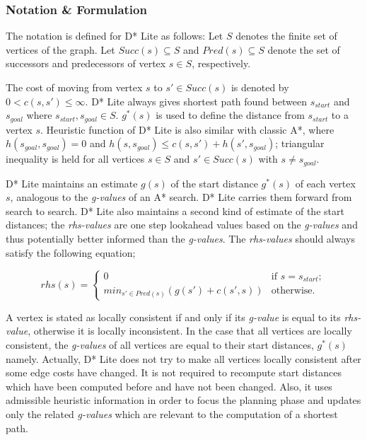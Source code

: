 \documentclass[10pt,journal]{IEEEtran}
\begin{document}
\subsubsection{Notation \& Formulation}
The notation is defined for D* Lite as follows: Let $S$ denotes the finite set of vertices of the graph. Let $Succ(s) \subseteq S$ and $Pred(s) \subseteq S$ denote the set of successors and predecessors of vertex $s \in S$, respectively. 

The cost of moving from vertex $s$ to $s' \in Succ(s)$ is denoted by $0 < c(s, s') \leq \infty$. D* Lite always gives shortest path found between $s_{start}$ and $s_{goal}$ where $s_{start}, s_{goal} \in S$. $g^*(s)$ is used to define the distance from $s_{start}$ to a vertex $s$. Heuristic function of D* Lite is also similar with classic A*, where $h(s_{goal}, s_{goal}) = 0$ and $h(s, s_{goal}) \leq c(s, s') + h(s', s_{goal})$; triangular inequality is held for all vertices $s \in S$ and $s' \in Succ(s)$ with $s \neq s_{goal}$.

D* Lite maintains an estimate $g(s)$ of the start distance $g^*(s)$ of each vertex $s$, analogous to the \textit{g-values} of an A* search. D* Lite carries them forward from search to search. D* Lite also maintains a second kind of estimate of the start distances; the \textit{rhs-values} are one step lookahead values based on the \textit{g-values} and thus potentially better informed than the \textit{g-values}. The \textit{rhs-values} should always satisfy the following equation;

\[ rhs(s) = \left\{ \begin{array}{cc}
0 & \mbox{if $s=s_{start}$};\\
min_{s' \in Pred(s)}(g(s') + c(s', s)) & \mbox{otherwise}.\end{array} \right. \] 

A vertex is stated as locally consistent if and only if its \textit{g-value} is equal to its \textit{rhs-value}, otherwise it is locally inconsistent. In the case that all vertices are locally consistent, the \textit{g-values} of all vertices are equal to their start distances, $g^*(s)$ namely. Actually, D* Lite does not try to make all vertices locally consistent after some edge costs have changed. It is not required to recompute start distances which have been computed before and have not been changed. Also, it uses admissible heuristic information in order to focus the planning phase and updates only the related \textit{g-values} which are relevant to the computation of a shortest path.
\end{document}

